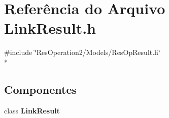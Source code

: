 \section{Referência do Arquivo Link\+Result.\+h}
\label{_2_models_2_link_2_link_result_8h}
{\ttfamily \#include \char`\"{}Res\+Operation2/\+Models/\+Res\+Op\+Result.\+h\char`\"{}}\\*
\subsection*{Componentes}
\begin{DoxyCompactItemize}
\item 
class {\bf Link\+Result}
\end{DoxyCompactItemize}
